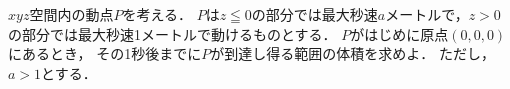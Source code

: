 \documentclass[../../main.tex]{subfiles}
\begin{document}
$xyz$空間内の動点$P$を考える．
$P$は$z \leqq 0$の部分では最大秒速$a$メートルで，$z>0$の部分では最大秒速1メートルで動けるものとする．
$P$がはじめに原点$(0,0,0)$にあるとき，
その1秒後までに$P$が到達し得る範囲の体積を求めよ．
ただし，$a>1$とする．
\end{document}

